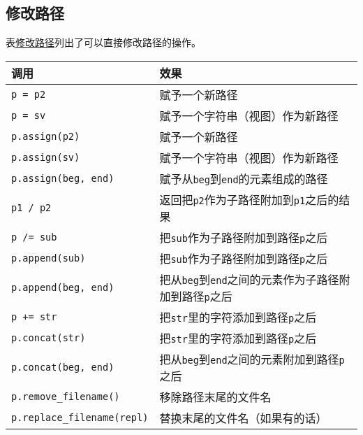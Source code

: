 \subsection{修改路径}
表\hyperref[t20.7]{修改路径}列出了可以直接修改路径的操作。
\begin{table}[ht]
    \centering
    \begin{tabular}{l|l}
        \hline
        \textbf{调用}                         & \textbf{效果}                                            \\
        \hline
        \texttt{p = p2}                     & 赋予一个新路径                                                \\
        \texttt{p = sv}                     & 赋予一个字符串（视图）作为新路径                                       \\
        \texttt{p.assign(p2)}               & 赋予一个新路径                                                \\
        \texttt{p.assign(sv)}               & 赋予一个字符串（视图）作为新路径                                       \\
        \texttt{p.assign(beg, end)}         & 赋予从\texttt{beg}到\texttt{end}的元素组成的路径                   \\
        \texttt{p1 / p2}                    & 返回把\texttt{p2}作为子路径附加到\texttt{p1}之后的结果                 \\
        \texttt{p /= sub}                   & 把\texttt{sub}作为子路径附加到路径\texttt{p}之后                    \\
        \texttt{p.append(sub)}              & 把\texttt{sub}作为子路径附加到路径\texttt{p}之后                    \\
        \texttt{p.append(beg, end)}         & 把从\texttt{beg}到\texttt{end}之间的元素作为子路径附加到路径\texttt{p}之后 \\
        \texttt{p += str}                   & 把\texttt{str}里的字符添加到路径\texttt{p}之后                     \\
        \texttt{p.concat(str)}              & 把\texttt{str}里的字符添加到路径\texttt{p}之后                     \\
        \texttt{p.concat(beg, end)}         & 把从\texttt{beg}到\texttt{end}之间的元素附加到路径\texttt{p}之后      \\
        \texttt{p.remove\_filename()}       & 移除路径末尾的文件名                                             \\
        \texttt{p.replace\_filename(repl)}  & 替换末尾的文件名（如果有的话）                                        \\

\end{tabular}
\end{table}
